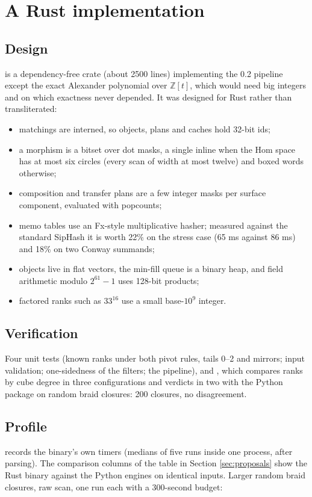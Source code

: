 \section{A Rust implementation}
\label{sec:rust}

\subsection{Design}
 is a dependency-free crate (about 2500 lines) implementing the 0.2
pipeline except the exact Alexander polynomial over $\mathbb Z[t]$, which
would need big integers and on which exactness never depended. It was designed
for Rust rather than transliterated:
\begin{itemize}
\item matchings are interned, so objects, plans and caches hold 32-bit ids;
\item a morphism is a bitset over dot masks, a single inline  when
  the Hom space has at most six circles (every scan of width at most twelve)
  and boxed words otherwise;
\item composition and transfer plans are a few integer masks per surface
  component, evaluated with popcounts;
\item memo tables use an Fx-style multiplicative hasher; measured against the
  standard SipHash it is worth 22\% on the stress case (65 ms against 86 ms)
  and 18\% on two Conway summands;
\item objects live in flat vectors, the min-fill queue is a binary heap, and
  field arithmetic modulo $2^{61}-1$ uses 128-bit products;
\item factored ranks such as $33^{16}$ use a small base-$10^9$ integer.
\end{itemize}

\subsection{Verification}
Four unit tests (known ranks under both pivot rules, tails 0--2 and mirrors;
input validation; one-sidedness of the filters; the pipeline), and
, which compares ranks by cube degree in three
configurations and verdicts in two with the Python package on random braid
closures: 200 closures, no disagreement.

\subsection{Profile}
 records the binary's own timers (medians of five runs
inside one process, after parsing). The comparison columns of the table in
Section \ref{sec:proposals} show the Rust binary against the Python engines on
identical inputs. Larger random braid closures, raw scan, one run each with a
300-second budget:


